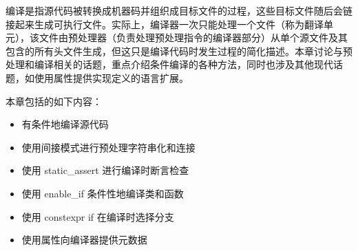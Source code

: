 编译是指源代码被转换成机器码并组织成目标文件的过程，这些目标文件随后会链接起来生成可执行文件。实际上，编译器一次只能处理一个文件（称为翻译单元），该文件由预处理器（负责处理预处理指令的编译器部分）从单个源文件及其包含的所有头文件生成，但这只是编译代码时发生过程的简化描述。本章讨论与预处理和编译相关的话题，重点介绍条件编译的各种方法，同时也涉及其他现代话题，如使用属性提供实现定义的语言扩展。

本章包括的如下内容：

\begin{itemize}
\item
有条件地编译源代码

\item
使用间接模式进行预处理字符串化和连接

\item
使用 static\_assert 进行编译时断言检查

\item
使用 enable\_if 条件性地编译类和函数

\item
使用 constexpr if 在编译时选择分支

\item
使用属性向编译器提供元数据
\end{itemize}
